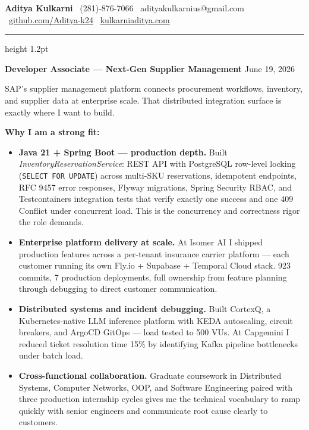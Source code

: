 \documentclass[11pt,letterpaper]{article}
\begin{document}
\thispagestyle{empty}

{\large \textbf{Aditya Kulkarni}} \hfill
{\color{SAPBlue} \faPhone\ (281)-876-7066} \quad
{\color{SAPBlue} \faEnvelope\ adityakulkarnius@gmail.com} \\
{\color{SAPBlue} \faGithub\ \href{https://github.com/Aditya-k24}{github.com/Aditya-k24}} \quad
{\color{SAPBlue} \faGlobe\ \href{https://www.kulkarniaditya.com}{kulkarniaditya.com}}

\vspace{6pt}
{\color{SAPBlue}\hrule height 1.2pt}
\vspace{12pt}

{\color{SAPBlue} \textbf{Developer Associate --- Next-Gen Supplier Management}} \hfill June 19, 2026

\vspace{10pt}

SAP's supplier management platform connects procurement workflows, inventory, and supplier data at enterprise scale. That distributed integration surface is exactly where I want to build.

\vspace{6pt}

\textbf{Why I am a strong fit:}

\begin{itemize}
  \item[\faAngleRight] \textbf{Java 21 + Spring Boot --- production depth.} Built \textit{InventoryReservationService}: REST API with PostgreSQL row-level locking (\texttt{SELECT FOR UPDATE}) across multi-SKU reservations, idempotent endpoints, RFC 9457 error responses, Flyway migrations, Spring Security RBAC, and Testcontainers integration tests that verify exactly one success and one 409 Conflict under concurrent load. This is the concurrency and correctness rigor the role demands.

  \item[\faAngleRight] \textbf{Enterprise platform delivery at scale.} At Isomer AI I shipped production features across a per-tenant insurance carrier platform --- each customer running its own Fly.io + Supabase + Temporal Cloud stack. 923 commits, 7 production deployments, full ownership from feature planning through debugging to direct customer communication.

  \item[\faAngleRight] \textbf{Distributed systems and incident debugging.} Built CortexQ, a Kubernetes-native LLM inference platform with KEDA autoscaling, circuit breakers, and ArgoCD GitOps --- load tested to 500 VUs. At Capgemini I reduced ticket resolution time 15\% by identifying Kafka pipeline bottlenecks under batch load.

  \item[\faAngleRight] \textbf{Cross-functional collaboration.} Graduate coursework in Distributed Systems, Computer Networks, OOP, and Software Engineering paired with three production internship cycles gives me the technical vocabulary to ramp quickly with senior engineers and communicate root cause clearly to customers.
\end{itemize}
\end{document}
